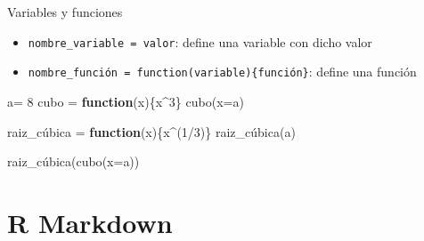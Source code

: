 \documentclass[
  ignorenonframetext,
  aspectratio=169]{beamer}
\newenvironment{Shaded}{\begin{snugshade}}{\end{snugshade}}
\newcommand{\AttributeTok}[1]{\textcolor[rgb]{0.77,0.63,0.00}{#1}}
\newcommand{\ControlFlowTok}[1]{\textcolor[rgb]{0.13,0.29,0.53}{\textbf{#1}}}
\newcommand{\DecValTok}[1]{\textcolor[rgb]{0.00,0.00,0.81}{#1}}
\newcommand{\FunctionTok}[1]{\textcolor[rgb]{0.00,0.00,0.00}{#1}}
\newcommand{\NormalTok}[1]{#1}
\newcommand{\OtherTok}[1]{\textcolor[rgb]{0.56,0.35,0.01}{#1}}
\newcommand{\SpecialCharTok}[1]{\textcolor[rgb]{0.00,0.00,0.00}{#1}}
\providecommand{\tightlist}{%
  \setlength{\itemsep}{0pt}\setlength{\parskip}{0pt}}
\let\oldverbatim\verbatim
\let\endoldverbatim\endverbatim
\renewenvironment{verbatim}{\tiny\oldverbatim}{\endoldverbatim}
\begin{document}
\begin{frame}[fragile]{Variables y funciones}
\protect\hypertarget{variables-y-funciones}{}
\begin{itemize}
\tightlist
\item
  \texttt{nombre\_variable\ =\ valor}: define una variable con dicho
  valor
\item
  \texttt{nombre\_función\ =\ function(variable)\{función\}}: define una
  función
\end{itemize}

\begin{Shaded}
\begin{Highlighting}[]
\NormalTok{a}\OtherTok{=} \DecValTok{8}
\NormalTok{cubo }\OtherTok{=} \ControlFlowTok{function}\NormalTok{(x)\{x}\SpecialCharTok{\^{}}\DecValTok{3}\NormalTok{\}}
\FunctionTok{cubo}\NormalTok{(}\AttributeTok{x=}\NormalTok{a)}
\end{Highlighting}
\end{Shaded}

\begin{verbatim}
[1] 512
\end{verbatim}

\begin{Shaded}
\begin{Highlighting}[]
\NormalTok{raiz\_cúbica }\OtherTok{=} \ControlFlowTok{function}\NormalTok{(x)\{x}\SpecialCharTok{\^{}}\NormalTok{(}\DecValTok{1}\SpecialCharTok{/}\DecValTok{3}\NormalTok{)\}}
\NormalTok{raiz\_cúbica(a)}
\end{Highlighting}
\end{Shaded}

\begin{verbatim}
[1] 2
\end{verbatim}

\begin{Shaded}
\begin{Highlighting}[]
\NormalTok{raiz\_cúbica(}\FunctionTok{cubo}\NormalTok{(}\AttributeTok{x=}\NormalTok{a))}
\end{Highlighting}
\end{Shaded}

\begin{verbatim}
[1] 8
\end{verbatim}
\end{frame}

\hypertarget{r-markdown}{%
\section{R Markdown}\label{r-markdown}}
\end{document}
